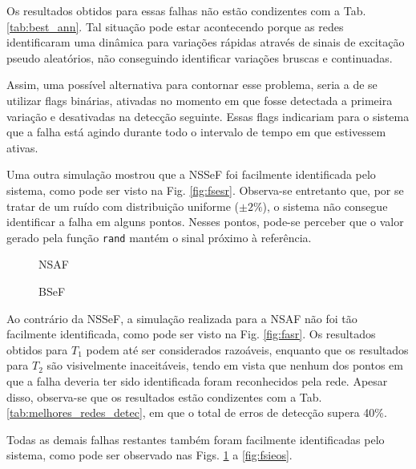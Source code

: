 \documentclass[10pt,fleqn,a4paper]{article}
\begin{document}
Os resultados obtidos para essas falhas não estão condizentes com a Tab.
\ref{tab:best_ann}. Tal situação pode estar acontecendo porque as redes
identificaram uma dinâmica para variações rápidas através de sinais de excitação
pseudo aleatórios, não conseguindo identificar variações bruscas e continuadas.

Assim, uma possível alternativa para contornar esse problema, seria a de se
utilizar flags binárias, ativadas no momento em que fosse detectada a primeira
variação e desativadas na detecção seguinte. Essas flags indicariam para o
sistema que a falha está agindo durante todo o intervalo de tempo em que
estivessem ativas.

Uma outra simulação mostrou que a NSSeF foi facilmente identificada pelo
sistema, como pode ser visto na Fig. \ref{fig:fsesr}. Observa-se entretanto que,
por se tratar de um ruído com distribuição uniforme ($\pm 2\%$), o sistema não
consegue identificar a falha em alguns pontos. Nesses pontos, pode-se perceber
que o valor gerado pela função {\tt rand} mantém o sinal próximo à referência.

\begin{figure}[htb]
    \begin{minipage}[b]{0.48\linewidth}
        \scalebox{0.65}{}
        \vspace{0.5cm}
        \caption{NSAF}
        \label{fig:fasr}
    \end{minipage}
    \hfill
    \begin{minipage}[b]{0.48\linewidth}
        \scalebox{0.65}{}
        \vspace{0.5cm}
        \caption{BSeF}
        \label{fig:fseq}
    \end{minipage}
\end{figure}

Ao contrário da NSSeF, a simulação realizada para a NSAF não foi tão facilmente
identificada, como pode ser visto na Fig. \ref{fig:fasr}. Os resultados obtidos
para $T_1$ podem até ser considerados razoáveis, enquanto que os resultados para
$T_2$ são visivelmente inaceitáveis, tendo em vista que nenhum dos pontos em que
a falha deveria ter sido identificada foram reconhecidos pela rede. Apesar
disso, observa-se que os resultados estão condizentes com a Tab.
\ref{tab:melhores_redes_detec}, em que o total de erros de detecção supera 40\%.

Todas as demais falhas restantes também foram facilmente identificadas pelo
sistema, como pode ser observado nas Figs. \ref{fig:fseq} a \ref{fig:fsieos}. 
\end{document}
